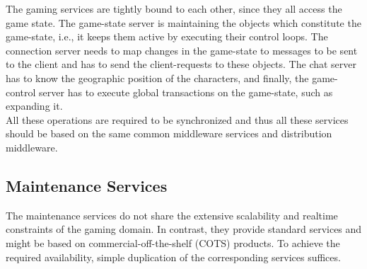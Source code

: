 \documentclass[a4paper, 10pt]{book}
\begin{document}
            The gaming services are tightly bound to each other, since they all access
            the game state. The game-state server is maintaining the
            objects which constitute the game-state, i.e., it keeps them active by
            executing their control loops. 
            The connection server needs to map changes in the game-state to
            messages to be sent to the client and has to send the client-requests
            to these objects. 
            The chat server has to know the geographic position of the characters, and
            finally, the game-control server has to execute global transactions on
            the game-state, such as expanding it.\\
            All these operations are required to be synchronized and thus all
            these services should be based on the same common middleware services
            and distribution middleware.


            \subsection{Maintenance Services}

            The maintenance services do not share the extensive scalability and
            realtime constraints of the gaming domain. In contrast, they provide
            standard services and might be based on commercial-off-the-shelf
            (COTS) products. To achieve the required availability, simple
            duplication of the corresponding services suffices. 
\end{document}
